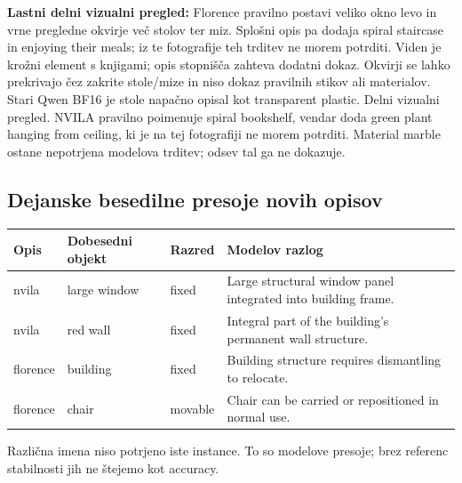 \textbf{Lastni delni vizualni pregled:} Florence pravilno postavi veliko okno levo in vrne pregledne okvirje več stolov ter miz. Splošni opis pa dodaja spiral staircase in enjoying their meals; iz te fotografije teh trditev ne morem potrditi. Viden je krožni element s knjigami; opis stopnišča zahteva dodatni dokaz. Okvirji se lahko prekrivajo čez zakrite stole/mize in niso dokaz pravilnih stikov ali materialov. Stari Qwen BF16 je stole napačno opisal kot transparent plastic. Delni vizualni pregled. NVILA pravilno poimenuje spiral bookshelf, vendar doda green plant hanging from ceiling, ki je na tej fotografiji ne morem potrditi. Material marble ostane nepotrjena modelova trditev; odsev tal ga ne dokazuje.
\subsection*{Dejanske besedilne presoje novih opisov}\begin{center}\small\begin{tabular}{p{1.6cm}p{4.2cm}p{1.8cm}p{7.6cm}}\toprule
Opis & Dobesedni objekt & Razred & Modelov razlog \\ \midrule
nvila & large window & fixed & Large structural window panel integrated into building frame. \\
nvila & red wall & fixed & Integral part of the building's permanent wall structure. \\
florence & building & fixed & Building structure requires dismantling to relocate. \\
florence & chair & movable & Chair can be carried or repositioned in normal use. \\
\bottomrule\end{tabular}\end{center}
Različna imena niso potrjeno iste instance. To so modelove presoje; brez referenc stabilnosti jih ne štejemo kot accuracy.

\newpage
